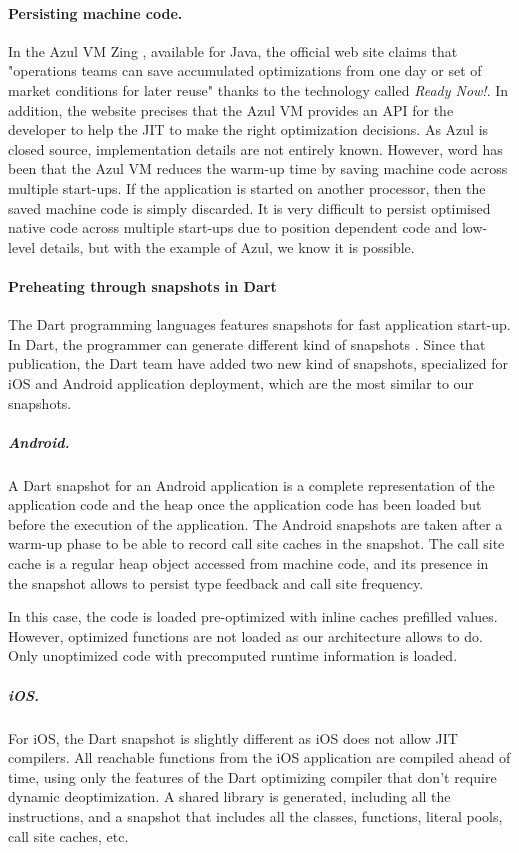 \documentclass[a4paper,12pt,twoside]{../includes/ThesisStyle}
\begin{document}
\paragraph{Persisting machine code.}

In the Azul VM Zing \cite{Azul}, available for Java, the official web site claims that "operations teams can save accumulated optimizations from one day or set of market conditions for later reuse" thanks to the technology called \emph{Ready Now!}. In addition, the website precises that the Azul VM provides an API for the developer to help the JIT to make the right optimization decisions. As Azul is closed source, implementation details are not entirely known. However, word has been that the Azul VM reduces the warm-up time by saving machine code across multiple start-ups. If the application is started on another processor, then the saved machine code is simply discarded. It is very difficult to persist optimised native code across multiple start-ups due to position dependent code and low-level details, but with the example of Azul, we know it is possible.

\paragraph{Preheating through snapshots in Dart}

The Dart programming languages features snapshots for fast application start-up. In Dart, the programmer can generate different kind of snapshots \cite{Anna13a}. Since that publication, the Dart team have added two new kind of snapshots, specialized for iOS and Android application deployment, which are the most similar to our snapshots.

\subparagraph{Android.} A Dart snapshot for an Android application is a complete representation of the application code and the heap once the application code has been loaded but before the execution of the application. The Android snapshots are taken after a warm-up phase to be able to record call site caches in the snapshot. The call site cache is a regular heap object accessed from machine code, and its presence in the snapshot allows to persist type feedback and call site frequency.

In this case, the code is loaded pre-optimized with inline caches prefilled values. However, optimized functions are not loaded as our architecture allows to do. Only unoptimized code with precomputed runtime information is loaded.

\subparagraph{iOS.} For iOS, the Dart snapshot is slightly different as iOS does not allow JIT compilers. All reachable functions from the iOS application are compiled ahead of time, using only the features of the Dart optimizing compiler that don't require dynamic deoptimization. A shared library is generated, including all the instructions, and a snapshot that includes all the classes, functions, literal pools, call site caches, etc.
\end{document}
